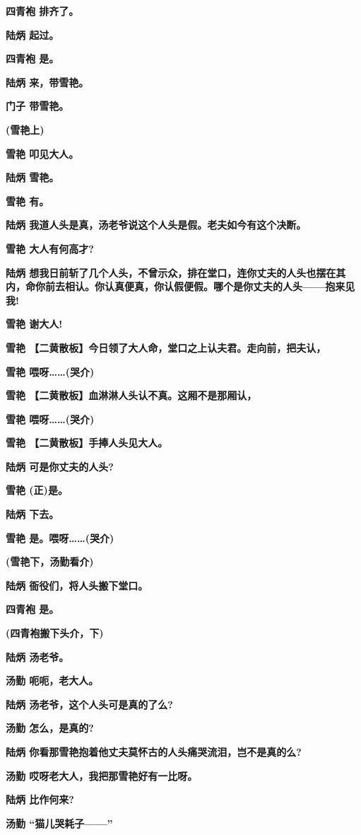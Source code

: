\textbf{四青袍 排齐了。}

\textbf{陆炳 起过。}

\textbf{四青袍 是。}

\textbf{陆炳 来，带雪艳。}

\textbf{门子 带雪艳。}

\textbf{(雪艳上)}

\textbf{雪艳 叩见大人。}

\textbf{陆炳 雪艳。}

\textbf{雪艳 有。}

\textbf{陆炳 我道人头是真，汤老爷说这个人头是假。老夫如今有这个决断。}

\textbf{雪艳 大人有何高才?}

\textbf{陆炳
想我日前斩了几个人头，不曾示众，排在堂口，连你丈夫的人头也摆在其内，命你前去相认。你认真便真，你认假便假。哪个是你丈夫的人头------抱来见我!}

\textbf{雪艳 谢大人!}

\textbf{雪艳
【二黄散板】今日领了大人命，堂口之上认夫君。走向前，把夫认，}

\textbf{雪艳 喂呀\ldots{}\ldots{}(哭介)}

\textbf{雪艳 【二黄散板】血淋淋人头认不真。这厢不是那厢认，}

\textbf{雪艳 喂呀\ldots{}\ldots{}(哭介)}

\textbf{雪艳 【二黄散板】手捧人头见大人。}

\textbf{陆炳 可是你丈夫的人头?}

\textbf{雪艳 (正)是。}

\textbf{陆炳 下去。}

\textbf{雪艳 是。喂呀\ldots{}\ldots{}(哭介)}

\textbf{(雪艳下，汤勤看介)}

\textbf{陆炳 衙役们，将人头搬下堂口。}

\textbf{四青袍 是。}

\textbf{(四青袍搬下头介，下)}

\textbf{陆炳 汤老爷。}

\textbf{汤勤 呃呃，老大人。}

\textbf{陆炳 汤老爷，这个人头可是真的了么?}

\textbf{汤勤 怎么，是真的?}

\textbf{陆炳 你看那雪艳抱着他丈夫莫怀古的人头痛哭流泪，岂不是真的么?}

\textbf{汤勤 哎呀老大人，我把那雪艳好有一比呀。}

\textbf{陆炳 比作何来?}

\textbf{汤勤 ``猫儿哭耗子------''}

